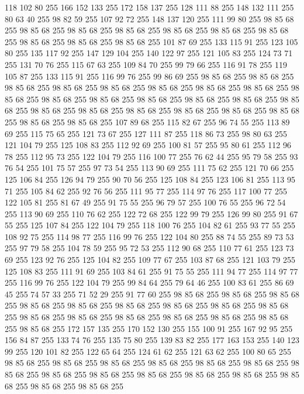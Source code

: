 118 102 80 255 166 152 133 255 172 158 137 255 128 111 88 255 148 132 111 255 80 63 40 255 98 82 59 255 107 92 72 255 148 137 120 255 111 99 80 255 98 85 68 255 98 85 68 255 98 85 68 255 98 85 68 255 98 85 68 255 98 85 68 255 98 85 68 255 98 85 68 255 98 85 68 255 98 85 68 255 101 87 69 255 133 115 91 255 123 105 80 255 135 117 92 255 147 129 104 255 140 122 97 255 121 105 83 255 124 73 71 255 131 70 76 255 115 67 63 255 109 84 70 255 99 79 66 255 116 91 78 255 119 105 87 255 133 115 91 255 116 99 76 255 99 86 69 255 98 85 68 255 98 85 68 255 98 85 68 255 98 85 68 255 98 85 68 255 98 85 68 255 98 85 68 255 98 85 68 255 98 85 68 255 98 85 68 255 98 85 68 255 98 85 68 255 98 85 68 255 98 85 68 255 98 85 68 255 98 85 68 255 98 85 68 255 98 85 68 255 98 85 68 255 98 85 68 255 98 85 68 255 98 85 68 255 98 85 68 255 107 89 68 255 115 82 67 255 96 74 55 255 113 89 69 255
115 75 65 255 121 73 67 255 127 111 87 255 118 86 73 255 98 80 63 255 121 104 79 255 125 108 83 255 112 92 69 255 100 81 57 255 95 80 61 255 112 96 78 255 112 95 73 255 122 104 79 255 116 100 77 255 76 62 44 255 95 79 58 255 93 76 54 255 101 75 57 255 97 73 54 255 113 90 69 255 111 75 62 255 121 70 66 255 125 106 84 255 126 94 79 255 90 70 56 255 125 108 84 255 123 106 81 255 113 95 71 255 105 84 62 255 92 76 56 255 111 95 77 255 114 97 76 255 117 100 77 255 122 105 81 255 81 67 49 255 91 75 55 255 96 79 57 255 100 76 55 255 96 72 54 255 113 90 69 255 110 76 62 255 122 72 68 255 122 99 79 255 126 99 80 255 91 67 55 255 125 107 84 255 122 104 79 255 118 100 76 255 104 82 61 255 93 77 55 255 108 92 75 255 114 98 77 255 116 99 76 255 122 104 80 255 88 74 55 255 89 73 53 255 97 79 58 255 104 78 59 255 95 72 53 255 112 90 68 255 110 77 61 255 123 73 69 255 123 92 76 255 125 104 82 255
109 77 67 255 103 87 68 255 121 103 79 255 125 108 83 255 111 91 69 255 103 84 61 255 91 75 55 255 111 94 77 255 114 97 77 255 116 99 76 255 122 104 79 255 99 84 64 255 79 64 46 255 100 83 61 255 86 69 45 255 74 57 33 255 71 52 29 255 91 77 60 255 98 85 68 255 98 85 68 255 98 85 68 255 98 85 68 255 98 85 68 255 98 85 68 255 98 85 68 255 98 85 68 255 98 85 68 255 98 85 68 255 98 85 68 255 98 85 68 255 98 85 68 255 98 85 68 255 98 85 68 255 98 85 68 255 172 157 135 255 170 152 130 255 155 100 91 255 167 92 95 255 156 84 87 255 133 74 76 255 135 75 80 255 139 83 82 255 177 163 153 255 140 123 99 255 120 101 82 255 122 65 64 255 124 61 62 255 121 63 62 255 100 80 65 255 98 85 68 255 98 85 68 255 98 85 68 255 98 85 68 255 98 85 68 255 98 85 68 255 98 85 68 255 98 85 68 255 98 85 68 255 98 85 68 255 98 85 68 255 98 85 68 255 98 85 68 255 98 85 68 255 98 85 68 255
